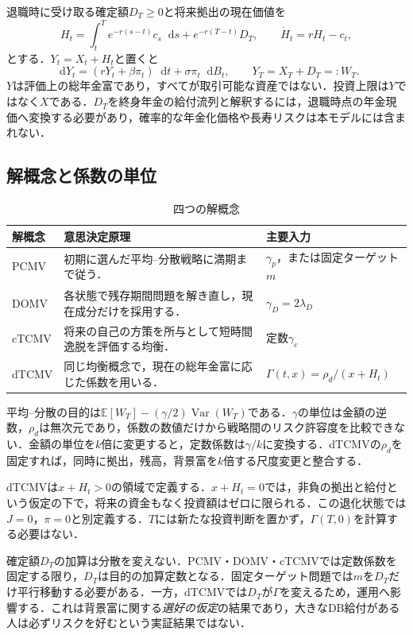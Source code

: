 \documentclass[11pt,a4paper]{article}
\numberwithin{equation}{section}
\numberwithin{table}{section}
\numberwithin{figure}{section}
\theoremstyle{plain}
\theoremstyle{definition}
\newcommand{\E}{\mathbb{E}}
\DeclareMathOperator{\Var}{Var}
\newcommand{\dd}{\mathop{}\!\mathrm{d}}
\begin{document}
退職時に受け取る確定額$D_T\geq0$と将来拠出の現在価値を
\begin{equation}
H_t=\int_t^T e^{-r(s-t)}c_s\dd s+e^{-r(T-t)}D_T,
\qquad \dot H_t=rH_t-c_t,
\label{eq:H}
\end{equation}
とする．$Y_t=X_t+H_t$と置くと
\begin{equation}
\dd Y_t=(rY_t+\beta\pi_t)\dd t+\sigma\pi_t\dd B_t,
\qquad Y_T=X_T+D_T=:W_T.
\label{eq:Y}
\end{equation}
$Y$は評価上の総年金富であり，すべてが取引可能な資産ではない．投資上限は$Y$ではなく$X$である．$D_T$を終身年金の給付流列と解釈するには，退職時点の年金現価へ変換する必要があり，確率的な年金化価格や長寿リスクは本モデルには含まれない．

\subsection{解概念と係数の単位}
\begin{table}[htbp]\centering\small
\caption{四つの解概念}\label{tab:concepts}
\begin{tabularx}{\textwidth}{p{17mm}X p{39mm}}
\toprule 解概念 & 意思決定原理 & 主要入力 \\ \midrule
PCMV & 初期に選んだ平均--分散戦略に満期まで従う． & $\gamma_p$，または固定ターゲット$m$ \\
DOMV & 各状態で残存期間問題を解き直し，現在成分だけを採用する． & $\gamma_D=2\lambda_D$ \\
cTCMV & 将来の自己の方策を所与として短時間逸脱を評価する均衡． & 定数$\gamma_c$ \\
dTCMV & 同じ均衡概念で，現在の総年金富に応じた係数を用いる． & $\Gamma(t,x)=\rho_d/(x+H_t)$ \\
\bottomrule\end{tabularx}\end{table}
平均--分散の目的は$\E[W_T]-(\gamma/2)\Var(W_T)$である．$\gamma$の単位は金額の逆数，$\rho_d$は無次元であり，係数の数値だけから戦略間のリスク許容度を比較できない．金額の単位を$k$倍に変更すると，定数係数は$\gamma/k$に変換する．dTCMVの$\rho_d$を固定すれば，同時に拠出，残高，背景富を$k$倍する尺度変更と整合する．

dTCMVは$x+H_t>0$の領域で定義する．$x+H_t=0$では，非負の拠出と給付という仮定の下で，将来の資金もなく投資額はゼロに限られる．この退化状態では$J=0$，$\pi=0$と別定義する．$T$には新たな投資判断を置かず，$\Gamma(T,0)$を計算する必要はない．

確定額$D_T$の加算は分散を変えない．PCMV・DOMV・cTCMVでは定数係数を固定する限り，$D_T$は目的の加算定数となる．固定ターゲット問題では$m$を$D_T$だけ平行移動する必要がある．一方，dTCMVでは$D_T$が$\Gamma$を変えるため，運用へ影響する．これは背景富に関する\emph{選好の仮定}の結果であり，大きなDB給付がある人は必ずリスクを好むという実証結果ではない．
\end{document}
